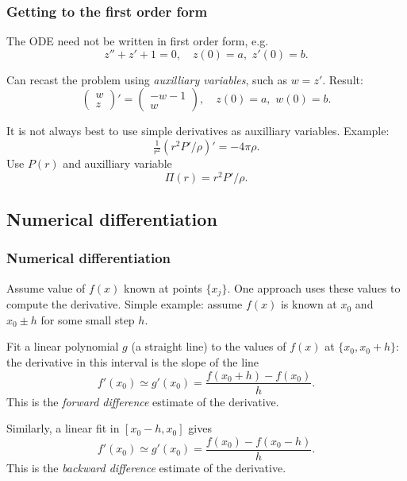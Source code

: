 \documentclass{beamer}
\begin{document}
\begin{frame}
  \frametitle{Getting to the first order form}

  The ODE need not be written in first order form, e.g.\
  \begin{equation*}
    z'' + z' + 1 = 0, \quad z(0) = a, \,\, z'(0) = b.
  \end{equation*} \pause

  Can recast the problem using \emph{auxilliary variables}, such as $w
  = z'$. \pause Result:
  \begin{equation*}
    \begin{pmatrix}
      w \\ z
    \end{pmatrix}' =
    \begin{pmatrix}
      -w - 1 \\ w
    \end{pmatrix}, \quad z(0) = a, \, \, w(0) = b.
  \end{equation*} \pause

  It is not always best to use simple derivatives as auxilliary
  variables. Example:
  \begin{equation*}
    \tfrac{1}{r^2} \left( r^2 P' / \rho \right)' = - 4 \pi \rho.
  \end{equation*}
  Use $P(r)$ and auxilliary variable
  \begin{equation*}
    \Pi(r) = r^2 P' / \rho.
  \end{equation*}

\end{frame}


\subsection{Numerical differentiation}

\begin{frame}
  \frametitle{Numerical differentiation}

  Assume value of $f(x)$ known at points $\{ x_j \}$. One approach
  uses these values to compute the derivative. \pause Simple example:
  assume $f(x)$ is known at $x_0$ and $x_0 \pm h$ for some small step
  $h$. \pause

  \vspace{1ex}

  Fit a linear polynomial $g$ (a straight line) to the values of $f(x)$ at
  $\{x_0, x_0 + h\}$: the derivative in this interval is the slope of
  the line
  \begin{equation*}
    f'(x_0) \simeq g'(x_0) = \frac{f(x_0 + h) - f(x_0)}{h}.
  \end{equation*}
  This is the \emph{forward difference} estimate of the derivative.
  \pause

  \vspace{1ex}

  Similarly, a linear fit in $[x_0 - h, x_0]$ gives
  \begin{equation*}
    f'(x_0) \simeq g'(x_0)  = \frac{f(x_0) - f(x_0 - h)}{h}.
  \end{equation*}
  This is the \emph{backward difference} estimate of the derivative.

\end{frame}
\end{document}
